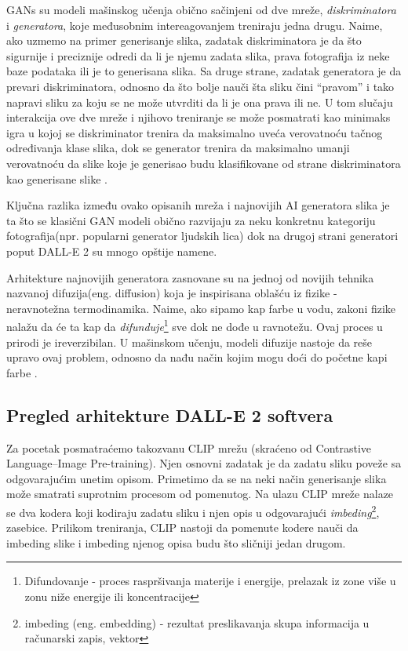 \documentclass[12pt, letterpaper]{article}
\begin{document}
GANs su modeli mašinskog učenja obično sačinjeni od dve mreže, \textit{diskriminatora} i \textit{generatora}, koje međusobnim intereagovanjem treniraju jedna drugu. Naime, ako uzmemo na primer generisanje slika, zadatak diskriminatora je da što sigurnije i preciznije odredi da li je njemu zadata slika, prava fotografija iz neke baze podataka ili je to generisana slika. Sa druge strane, zadatak generatora je da prevari diskriminatora, odnosno da što bolje nauči šta sliku čini “pravom” i tako napravi sliku za koju se ne može utvrditi da li je ona prava ili ne. U tom slučaju interakcija ove dve mreže i njihovo treniranje se može posmatrati kao minimaks igra u kojoj se diskriminator trenira da maksimalno uveća verovatnoću tačnog određivanja klase slika, dok se generator trenira da maksimalno umanji verovatnoću da slike koje je generisao budu klasifikovane od strane diskriminatora kao generisane slike \cite{gan}.

Ključna razlika između ovako opisanih mreža i najnovijih AI generatora slika je ta što se klasični GAN modeli obično razvijaju za neku konkretnu kategoriju fotografija(npr. popularni generator ljudskih lica) dok na drugoj strani generatori poput DALL-E 2 su mnogo opštije namene.

Arhitekture najnovijih generatora zasnovane su na jednoj od novijih tehnika nazvanoj difuzija(eng. diffusion) koja je inspirisana oblašću iz fizike - neravnotežna termodinamika. Naime, ako sipamo kap farbe u vodu, zakoni fizike nalažu da će ta kap da \textit{difunduje}\footnote{Difundovanje - proces raspršivanja materije i energije, prelazak iz zone više u zonu niže energije ili koncentracije} sve dok ne dođe u ravnotežu. Ovaj proces u prirodi je ireverzibilan. U mašinskom učenju, modeli difuzije nastoje da reše upravo ovaj problem, odnosno da nađu način kojim mogu doći do početne kapi farbe \cite{difvideo}.

\subsection{Pregled arhitekture DALL-E 2 softvera}

Za pocetak posmatraćemo takozvanu CLIP mrežu (skraćeno od Contrastive Language–Image Pre-training). Njen osnovni zadatak je da zadatu sliku poveže sa odgovarajućim unetim opisom. Primetimo da se na neki način generisanje slika može smatrati suprotnim procesom od pomenutog. Na ulazu CLIP mreže nalaze se dva kodera koji kodiraju zadatu sliku i njen opis u odgovarajući \textit{imbeding}\footnote{imbeding (eng. embedding) - rezultat preslikavanja skupa informacija u računarski zapis, vektor}, zasebice. Prilikom treniranja, CLIP nastoji da pomenute kodere nauči da imbeding slike i imbeding njenog opisa budu što sličniji jedan drugom\cite{openai_dali}.
\end{document}
